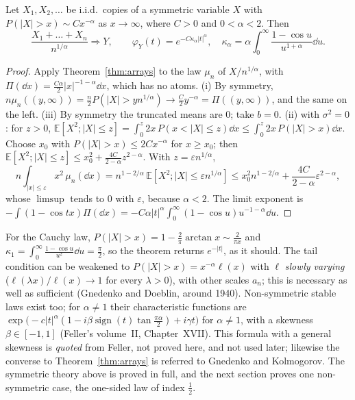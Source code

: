 \begin{theorem}\label{thm:domain}
Let $X_1,X_2,\dots$ be i.i.d.\ copies of a symmetric variable $X$ with $P(|X|>x)\sim Cx^{-\alpha}$ as $x\to\infty$, where $C>0$ and $0<\alpha<2$. Then
\[
\frac{X_1+\dots+X_n}{n^{1/\alpha}}\Rightarrow Y,\qquad\varphi_Y(t)=e^{-C\kappa_\alpha|t|^\alpha},\quad\kappa_\alpha=\alpha\int_0^\infty\frac{1-\cos u}{u^{1+\alpha}}\dd u.
\]
\end{theorem}
\begin{proof}
Apply Theorem~\ref{thm:arrays} to the law $\mu_n$ of $X/n^{1/\alpha}$, with $\Pi(\dd x)=\frac{C\alpha}2|x|^{-1-\alpha}\dd x$, which has no atoms. (i) By symmetry,
$n\mu_n((y,\infty))=\frac n2P(|X|>yn^{1/\alpha})\to\frac C2y^{-\alpha}=\Pi((y,\infty))$, and the same on the left. (iii) By symmetry the truncated means are $0$; take $b=0$.
(ii) with $\sigma^2=0$: for $z>0$, $\mathbb E[X^2;|X|\le z]=\int_0^z2x\,P(x<|X|\le z)\dd x\le\int_0^z2x\,P(|X|>x)\dd x$. Choose $x_0$ with $P(|X|>x)\le2Cx^{-\alpha}$ for
$x\ge x_0$; then $\mathbb E[X^2;|X|\le z]\le x_0^2+\frac{4C}{2-\alpha}z^{2-\alpha}$. With $z=\varepsilon n^{1/\alpha}$,
\[
n\int_{|x|\le\varepsilon}x^2\,\mu_n(\dd x)=n^{1-2/\alpha}\,\mathbb E[X^2;|X|\le\varepsilon n^{1/\alpha}]\le x_0^2n^{1-2/\alpha}+\frac{4C}{2-\alpha}\varepsilon^{2-\alpha},
\]
whose $\limsup$ tends to $0$ with $\varepsilon$, because $\alpha<2$. The limit exponent is $-\int(1-\cos tx)\Pi(\dd x)=-C\alpha|t|^\alpha\int_0^\infty(1-\cos u)u^{-1-\alpha}\dd u$.
\end{proof}

For the Cauchy law, $P(|X|>x)=1-\frac2\pi\arctan x\sim\frac2{\pi x}$ and $\kappa_1=\int_0^\infty\frac{1-\cos u}{u^2}\dd u=\frac\pi2$, so the theorem returns $e^{-|t|}$, as it should.
The tail condition can be weakened to $P(|X|>x)=x^{-\alpha}\ell(x)$ with $\ell$ \emph{slowly varying} ($\ell(\lambda x)/\ell(x)\to1$ for every $\lambda>0$), with
other scales $a_n$; this is necessary as well as sufficient (Gnedenko and Doeblin, around 1940). Non-symmetric stable laws exist too; for $\alpha\ne1$ their characteristic functions are $\exp\bigl(-c|t|^\alpha(1-i\beta\operatorname{sign}(t)\tan\frac{\pi\alpha}2)+i\gamma t\bigr)$ for $\alpha\ne1$, with a skewness $\beta\in[-1,1]$ (Feller's volume~II,
Chapter~XVII). This formula with a general skewness is \emph{quoted} from Feller, not proved here, and not used later; likewise the converse to
Theorem~\ref{thm:arrays} is referred to Gnedenko and Kolmogorov. The symmetric theory above is proved in full, and the next section proves one
non-symmetric case, the one-sided law of index $\frac12$.

